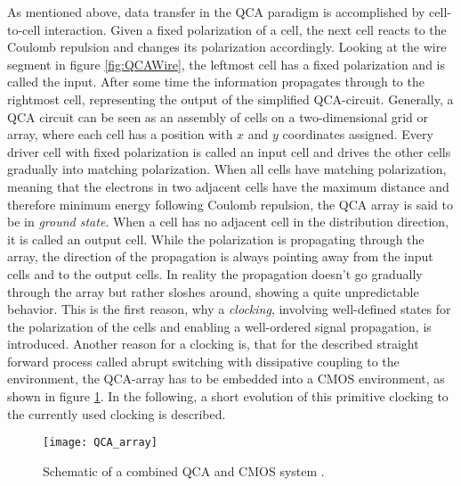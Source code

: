 As mentioned above, data transfer in the QCA paradigm is accomplished by cell-to-cell interaction. Given a fixed polarization of a cell, the next cell reacts to the Coulomb repulsion and changes its polarization accordingly. Looking at the wire segment in figure \ref{fig:QCAWire}, the leftmost cell has a fixed polarization and is called the input. After some time the information propagates through to the rightmost cell, representing the output of the simplified QCA-circuit. Generally, a QCA circuit can be seen as an assembly of cells on a two-dimensional grid or array, where each cell has a position with $x$ and $y$ coordinates assigned. Every driver cell with fixed polarization is called an input cell and drives the other cells gradually into matching polarization. When all cells have matching polarization, meaning that the electrons in two adjacent cells have the maximum distance and therefore minimum energy following Coulomb repulsion, the QCA array is said to be in \textit{ground state}. When a cell has no adjacent cell in the distribution direction, it is called an output cell. While the polarization is propagating through the array, the direction of the propagation is always pointing away from the input cells and to the output cells. In reality the propagation doesn't go gradually through the array but rather sloshes around, showing a quite unpredictable behavior. This is the first reason, why a \textit{clocking}, involving well-defined states for the polarization of the cells and enabling a well-ordered signal propagation, is introduced. Another reason for a clocking is, that for the described straight forward process called abrupt switching with dissipative coupling to the environment, the QCA-array has to be embedded into a CMOS environment, as shown in figure \ref{fig:QCA_array}. In the following, a short evolution of this primitive clocking to the currently used clocking is described.

\begin{figure}
	\centering
	\texttt{[image: QCA\_array]}
	\caption{Schematic of a combined QCA and CMOS system \cite{lent1994quantum}.} 
	\label{fig:QCA_array}
\end{figure}

